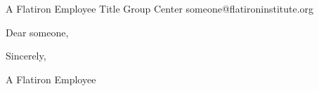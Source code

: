 \documentclass[letterpaper,12pt,preprint]{filh}
\begin{document}
%
    {A Flatiron Employee}%
    {Title}%
    {Group}%
    {Center}%
    {someone@flatironinstitute.org}

\noindent
Dear someone,

\blindtext
\Blindtext

\vspace{\baselineskip}\noindent
Sincerely,

\noindent
A Flatiron Employee
\end{document}
